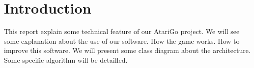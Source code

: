 \chapter{Introduction}

This report explain some technical feature of our AtariGo project. We will see some explanation about the use of our software. How the game works. How to improve this software. We will present some class diagram about the architecture. Some specific algorithm will be detailled.



\clearpage

